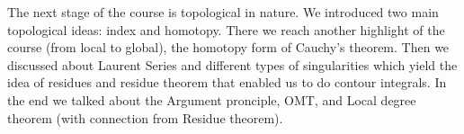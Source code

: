 \documentclass[a4paper]{article}
\begin{document}
The next stage of the course is topological in nature. We introduced two main topological ideas: index and homotopy. There we reach another highlight of the course (from local to global), the homotopy form of Cauchy's theorem. Then we discussed about Laurent Series and different types of singularities which yield the idea of residues and residue theorem that enabled us to do contour integrals. In the end we talked about the Argument pronciple, OMT, and Local degree theorem (with connection from Residue theorem).
\end{document}
